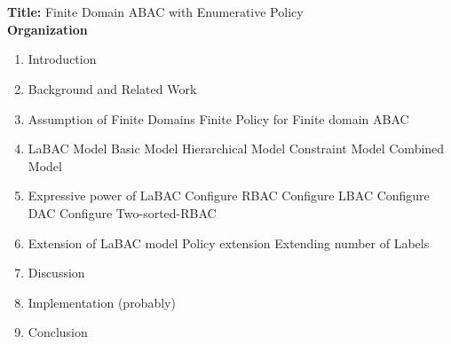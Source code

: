 \documentclass[]{article}
\title{}
\author{}
\begin{document}
\maketitle

\begin{abstract}

\end{abstract}

\section{}
\textbf{Title:} Finite Domain ABAC with Enumerative Policy \\
\textbf{Organization}

\begin{enumerate}
	\item Introduction
	\item Background and Related Work
	\item Assumption of Finite Domains
		\subitem Finite Policy for Finite domain ABAC
	\item LaBAC Model	
		\subitem Basic Model
		\subitem Hierarchical Model
		\subitem Constraint Model
		\subitem Combined Model
	\item Expressive power of LaBAC
		\subitem Configure RBAC
		\subitem Configure LBAC
		\subitem Configure DAC
		\subitem Configure Two-sorted-RBAC
	\item Extension of LaBAC model
		\subitem Policy extension
		\subitem Extending number of Labels
	\item Discussion
	\item Implementation (probably)
	\item Conclusion
	
\end{enumerate}
\end{document}
